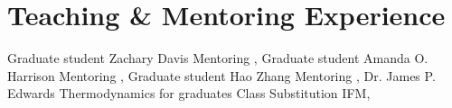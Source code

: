 \section{Teaching \& Mentoring Experience}

%
{Graduate student}%
{Zachary Davis}%
{Mentoring}%
{\DPA, \Purdue}%
{}
%
%
{Graduate student}%
{Amanda O. Harrison \textnormal{\cite{RuedaBecerril:2020ha}}}%
{Mentoring}%
{\DPA, \Purdue}%
{}
%
%
{Graduate student}%
{Hao Zhang \textnormal{\cite{Zhang:2020ch}}}%
{Mentoring}%
{\DPA, \Purdue}%
{}
%
%
{Dr. James P. Edwards}%
{Thermodynamics for graduates}%
{Class Substitution}%
{IFM, \UMSNHes}%
{}

